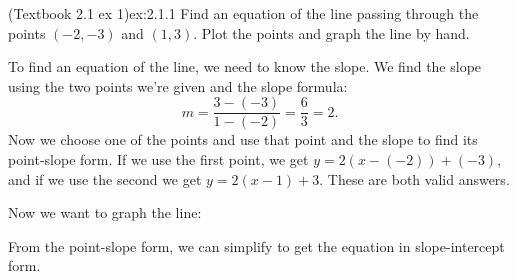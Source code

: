\documentclass{article}
\begin{document}
\begin{example}{(Textbook 2.1 ex 1)}{ex:2.1.1}
    Find an equation of the line passing through the points $(-2,-3)$ and $(1,3)$. Plot the points and graph the line by hand.
\end{example}
\begin{solution}
    To find an equation of the line, we need to know the slope. We find the slope using the two points we're given and the slope formula: \[m=\frac{3-(-3)}{1-(-2)}=\frac{6}{3}=2.\] Now we choose one of the points and use that point and the slope to find its point-slope form.
    If we use the first point, we get $y=2(x-(-2))+(-3)$, and if we use the second we get $y=2(x-1)+3$. These are both valid answers.

    Now we want to graph the line:
    \begin{center}\end{center}
\end{solution}

From the point-slope form, we can simplify to get the equation in slope-intercept form.
\end{document}
